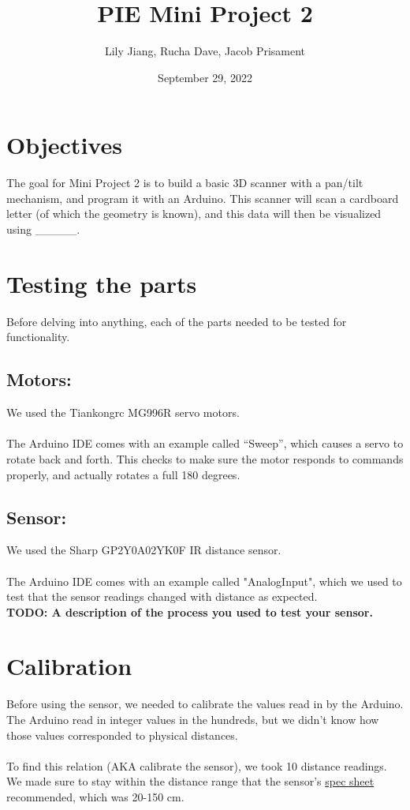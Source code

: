 \documentclass{article}
\title{PIE Mini Project 2}
\author{Lily Jiang, Rucha Dave, Jacob Prisament}
\date{September 29, 2022}
\begin{document}
\maketitle

\section{Objectives}
    The goal for Mini Project 2 is to build a basic 3D scanner with a pan/tilt mechanism, and program it with an Arduino. This scanner will scan a cardboard letter (of which the geometry is known), and this data will then be visualized using \_\_\_\_\_.


\section{Testing the parts}
Before delving into anything, each of the parts needed to be tested for functionality.

    \subsection{Motors:}
    We used the Tiankongrc MG996R servo motors. \\
    \\
    The Arduino IDE comes with an example called “Sweep”, which causes a servo to rotate back and forth. This checks to make sure the motor responds to commands properly, and actually rotates a full 180 degrees.

    \subsection{Sensor:}
    We used the Sharp GP2Y0A02YK0F IR distance sensor. \\
    \\
    The Arduino IDE comes with an example called "AnalogInput", which we used to test that the sensor readings changed with distance as expected. \\
    \textbf{TODO: A description of the process you used to test your sensor.}

\section{Calibration}
    Before using the sensor, we needed to calibrate the values read in by the Arduino. The Arduino read in integer values in the hundreds, but we didn't know how those values corresponded to physical distances. \\
    \\
    To find this relation (AKA calibrate the sensor), we took 10 distance readings. We made sure to stay within the distance range that the sensor's \href{https://www.sparkfun.com/datasheets/Sensors/Infrared/gp2y0a02yk_e.pdf}{spec sheet} recommended, which was 20-150 cm.
    
\end{document}
